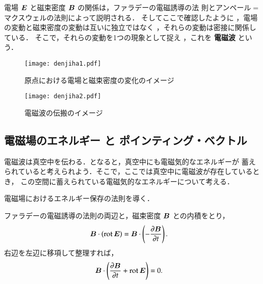             電場 $\boldsymbol{E}$ と磁束密度 $\boldsymbol{B}$ の関係は，ファラデーの電磁誘導の法
            則とアンペール$=$マクスウェルの法則によって説明される．
            そしてここで確認したように
            ，電場の変動と磁束密度の変動は互いに独立ではなく
            ，それらの変動は密接に関係している．
            そこで，それらの変動を1つの現象として捉え
            ，これを \textbf{電磁波} という．

            \begin{figure}[hbt]
                \begin{center}
                        \texttt{[image: denjiha1.pdf]}
                        \caption{原点における電場と磁束密度の変化のイメージ}
                        \label{fig:denjiha1}
                \end{center}
            \end{figure}

            \begin{figure}[hbt]
                \begin{center}
                        \texttt{[image: denjiha2.pdf]}
                        \caption{電磁波の伝搬のイメージ}
                        \label{fig:denjiha2}
                \end{center}
            \end{figure}

    \subsection{電磁場のエネルギー と ポインティング・ベクトル}
        \begin{mycomment}
            電磁波は真空中を伝わる．となると，真空中にも電磁気的なエネルギーが
            蓄えられていると考えられよう．そこで，ここでは真空中に電磁波が存在しているとき，
            この空間に蓄えられている電磁気的なエネルギーについて考える．
        \end{mycomment}

        電磁場におけるエネルギー保存の法則を導く．

        ファラデーの電磁誘導の法則の両辺と，磁束密度 $\boldsymbol{B}$ との内積をとり，
                                \begin{align}
                                \boldsymbol{B}\cdot\left(\mathrm{rot\,} \boldsymbol{E} \right)
                                &= \boldsymbol{B}\cdot\left(-\frac{\partial \boldsymbol{B}}{\partial t}\right).
                                \end{align}
        右辺を左辺に移項して整理すれば，
                                \begin{align}\label{eq:denyu11}
                                \bB\cdot\left(\frac{\rd \bB}{\rd t}
                                +\mathrm{rot\,} \bE\right)
                                &=0.
                                \end{align}

